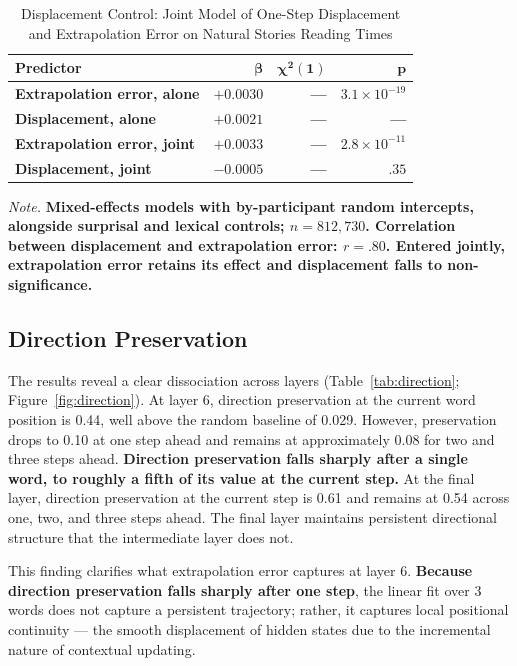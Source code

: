 \documentclass[12pt]{article}
\newcommand{\new}[1]{{\bfseries #1}}
\begin{document}
\begin{table}[!htbp]
\centering
\caption{Displacement Control: Joint Model of One-Step Displacement and Extrapolation Error on Natural Stories Reading Times}
\label{tab:displacement}
\begin{tabular}{lrrr}
\toprule
\textbf{Predictor} & $\boldsymbol{\beta}$ & $\boldsymbol{\chi^2(1)}$ & $\boldsymbol{p}$ \\
\midrule
\new{Extrapolation error, alone} & \new{$+0.0030$} & \new{---} & \new{$3.1 \times 10^{-19}$} \\
\new{Displacement, alone} & \new{$+0.0021$} & \new{---} & \new{---} \\
\new{Extrapolation error, joint} & \new{$+0.0033$} & \new{---} & \new{$2.8 \times 10^{-11}$} \\
\new{Displacement, joint} & \new{$-0.0005$} & \new{---} & \new{$.35$} \\
\bottomrule
\end{tabular}

\smallskip
\footnotesize
\textit{Note.} \new{Mixed-effects models with by-participant random intercepts, alongside surprisal and lexical controls; $n = 812{,}730$. Correlation between displacement and extrapolation error: $r = .80$. Entered jointly, extrapolation error retains its effect and displacement falls to non-significance.}
\end{table}

\subsection{Direction Preservation}

The results reveal a clear dissociation across layers (Table~\ref{tab:direction}; Figure~\ref{fig:direction}). At layer 6, direction preservation at the current word position is 0.44, well above the random baseline of 0.029. However, preservation drops to 0.10 at one step ahead and remains at approximately 0.08 for two and three steps ahead. \new{Direction preservation falls sharply after a single word, to roughly a fifth of its value at the current step.} At the final layer, direction preservation at the current step is 0.61 and remains at 0.54 across one, two, and three steps ahead. The final layer maintains persistent directional structure that the intermediate layer does not.

This finding clarifies what extrapolation error captures at layer 6. \new{Because direction preservation falls sharply after one step}, the linear fit over 3 words does not capture a persistent trajectory; rather, it captures local positional continuity --- the smooth displacement of hidden states due to the incremental nature of contextual updating.
\end{document}
